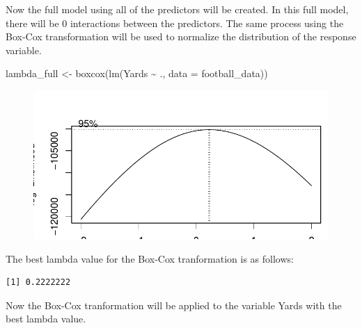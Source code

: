 \documentclass[
  super,
  preprint,
  3p]{elsarticle}
\newenvironment{Shaded}{\begin{snugshade}}{\end{snugshade}}
\newcommand{\AttributeTok}[1]{\textcolor[rgb]{0.40,0.45,0.13}{#1}}
\newcommand{\FunctionTok}[1]{\textcolor[rgb]{0.28,0.35,0.67}{#1}}
\newcommand{\NormalTok}[1]{\textcolor[rgb]{0.00,0.23,0.31}{#1}}
\newcommand{\OtherTok}[1]{\textcolor[rgb]{0.00,0.23,0.31}{#1}}
\newcommand{\SpecialCharTok}[1]{\textcolor[rgb]{0.37,0.37,0.37}{#1}}
\begin{document}
Now the full model using all of the predictors will be created. In this
full model, there will be 0 interactions between the predictors. The
same process using the Box-Cox transformation will be used to normalize
the distribution of the response variable.

\begin{Shaded}
\begin{Highlighting}[]
\NormalTok{lambda\_full }\OtherTok{\textless{}{-}} \FunctionTok{boxcox}\NormalTok{(}\FunctionTok{lm}\NormalTok{(Yards }\SpecialCharTok{\textasciitilde{}}\NormalTok{ ., }\AttributeTok{data =}\NormalTok{ football\_data))}
\end{Highlighting}
\end{Shaded}

\begin{figure}[H]

{\centering \includegraphics{project_report_files/figure-pdf/unnamed-chunk-7-1.pdf}

}

\end{figure}

The best lambda value for the Box-Cox tranformation is as follows:

\begin{Shaded}
\end{Shaded}

\begin{verbatim}
[1] 0.2222222
\end{verbatim}

Now the Box-Cox tranformation will be applied to the variable Yards with
the best lambda value.
\end{document}
